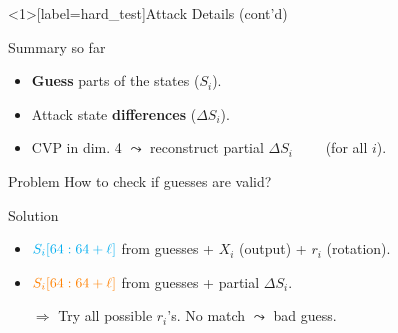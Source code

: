 \begin{frame}<1>[label=hard_test]{Attack Details (cont'd)}

  \begin{block}{Summary so far}
    \begin{itemize}
    \item \textbf{Guess} parts of the states ($S_i$).
    \item Attack state \textbf{differences} ($\Delta S_i$).
    \item CVP in dim. 4 $\leadsto$ reconstruct partial $\Delta S_i \qquad$ (for all $i$).
    \end{itemize}
  \end{block}

  \bigskip

  \begin{alertblock}{Problem}
    How to check if guesses are valid?
  \end{alertblock}

  \bigskip
  \pause

  \begin{exampleblock}{Solution}
    \begin{itemize}
    \item $\color{cyan} S_i[64:64+\ell]$ from guesses + $X_i$ (output) + $r_i$ (rotation).
    \item $\color{orange} S_i[64:64+\ell]$ from guesses + partial $\Delta S_i$.
    \item[$\Rightarrow$] Try all possible $r_i$'s. No match $\leadsto$ bad guess.
    \end{itemize}
  \end{exampleblock}
\end{frame}



